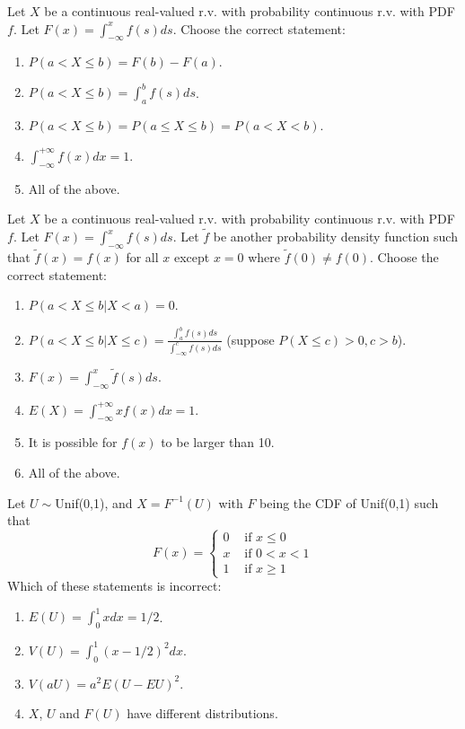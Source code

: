 \documentclass[poll_tutorial_format]{subfiles}
\begin{document}
	

	\begin{exercise}
		Let $X$ be a continuous real-valued r.v. with probability continuous r.v. with PDF $f$. Let $F(x)=\int_{-\infty}^x f(s)ds$. 
		Choose the correct statement:
		\begin{enumerate}
			\item $P(a< X\leq b) =F(b)-F(a)$.
			\item $P(a< X\leq b) =\int_{a}^b f(s)ds$.
			\item $P(a< X\leq b)=P(a\leq  X\leq b)=P(a< X< b)$.
			\item $\int_{-\infty}^{+\infty} f(x)dx=1$.
			\item All of the above. 
		\end{enumerate}
	\end{exercise}
	
	
	
	\begin{exercise}
	Let $X$ be a continuous real-valued r.v. with probability continuous r.v. with PDF $f$. Let $F(x)=\int_{-\infty}^x f(s)ds$. Let $\tilde{f}$ be another probability density function such that  $\tilde{f}(x)=f(x)$ for all $x$ except $x=0$ where $\tilde{f}(0)\neq {f}(0)$.
	Choose the correct statement:
	\begin{enumerate}
		\item $P(a< X\leq b|X<a) =0$.
		\item $P(a< X\leq b|X\leq c) =\frac{\int_{a}^b f(s)ds}{\int_{-\infty}^c f(s)ds}$ (suppose $P(X\leq c) >0, c>b$).
		\item $F(x)=\int_{-\infty}^x \tilde{f}(s)ds$.
		\item $E(X)= \int_{-\infty}^{+\infty} xf(x)dx=1$.
		\item It is possible for $f(x)$ to be larger than 10.
		\item All of the above. 
	\end{enumerate}
\end{exercise}

	
	
	\begin{exercise}
	Let $U\sim $Unif(0,1), and $X=F^{-1}(U)$ with $F$ being the CDF of Unif(0,1) such that 
	$$F(x)= \begin{cases}0 & \text { if } x \leq 0 \\ x & \text { if } 0<x<1 \\ 1 & \text { if } x \geq 1\end{cases} $$
	Which of these statements is incorrect:
	\begin{enumerate}
		\item $E(U)=\int_{0}^{1}xdx=1/2$.
		\item $V(U)=\int_{0}^{1}(x-1/2)^2dx$.
		\item $V(aU)=a^2E(U-EU)^2$.
		\item $X$, $U$ and $F(U)$ have different distributions. 
	\end{enumerate}
\end{exercise}
\end{document}
